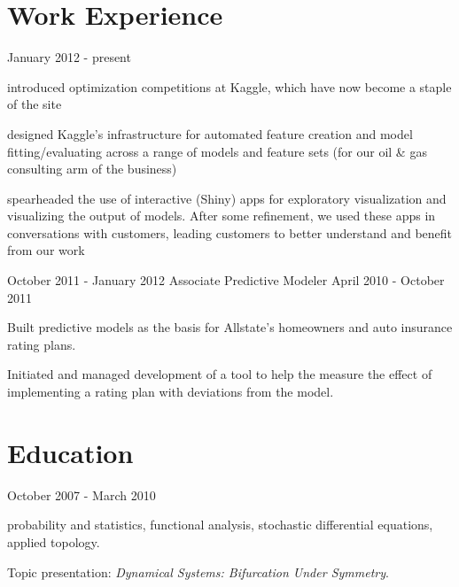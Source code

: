 \documentclass[letterpaper]{resume}
\author{David J. Chudzicki}
\begin{document}
\maketitle

\section{Work Experience}

{January 2012 - present}            


\begin{compactitem}
\item introduced optimization competitions at Kaggle, which have now become a staple of the site
\item designed Kaggle's infrastructure for automated feature creation and model fitting/evaluating across a range of models and feature sets (for our oil \& gas consulting arm of the business)
\item spearheaded the use of interactive (Shiny) apps for exploratory visualization and visualizing the output of models. After some refinement, we used these apps in conversations with customers, leading customers to better understand and benefit from our work
\end{compactitem}


{October 2011 - January 2012}
{Associate Predictive Modeler}
{April 2010 - October 2011}


\begin{compactitem}
\item Built predictive models as the basis for Allstate's homeowners and auto insurance rating plans.
\item Initiated and managed development of a tool to help the measure the effect of implementing a rating plan with deviations from the model.
\end{compactitem}

\section{Education}

{October 2007 - March 2010}
{}
{}
\begin{compactitem}
\item probability and statistics, functional analysis, stochastic differential equations, applied topology.
\item Topic presentation: \textit{Dynamical Systems: Bifurcation Under Symmetry}.      
\end{compactitem}
\end{document}
